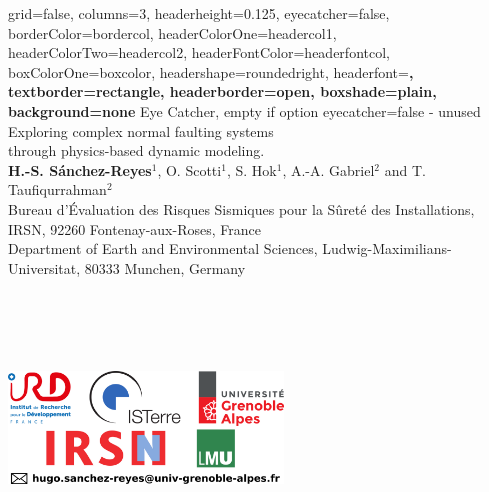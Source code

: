 


	

\color{standardfontcolor}

\begin{poster}{
		grid=false,
		columns=3,
		headerheight=0.125\textheight,
		eyecatcher=false,
        borderColor=bordercol,
		headerColorOne=headercol1,
		headerColorTwo=headercol2,
		headerFontColor=headerfontcol,
		boxColorOne=boxcolor,
		headershape=roundedright,
		headerfont=\sffamily\bfseries\Large,
		textborder=rectangle,
		headerborder=open,
		boxshade=plain,
		background=none
	}
	{
		Eye Catcher, empty if option eyecatcher=false - unused
	}
%
{
	\textsf %
	{\vskip 2.0cm Exploring complex normal faulting systems \\ through physics-based dynamic modeling.}
}
{\sf\vspace{-0.1em}\\
	{\textbf{H.-S. S\'anchez-Reyes$^1$}, O. Scotti$^1$, S. Hok$^1$, A.-A. Gabriel$^2$ and T. Taufiqurrahman$^2$}
	\vspace{0.2em}\\
	\normalsize{Bureau d’Évaluation des Risques Sismiques pour la Sûreté des Installations, IRSN, 92260 Fontenay-aux-Roses, France
	\vspace{0.1em}\\
	Department of Earth and Environmental Sciences, Ludwig-Maximilians-Universitat, 80333 Munchen, Germany	 	
	} \\ \\ \\ \\ \\ 
}
{ \begin{minipage}{2cm}
  \vskip -0.5cm \hskip -5cm \includegraphics[width=7.3cm]{../../logos/logo_poster_2022.png} \\

\end{minipage}}
\end{poster}
